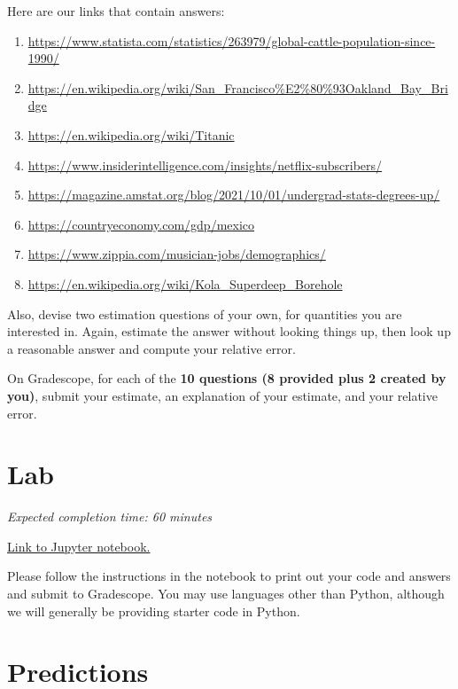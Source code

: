 \documentclass[11pt]{article}
\begin{document}
Here are our links that contain answers:
\begin{enumerate}
\item \url{https://www.statista.com/statistics/263979/global-cattle-population-since-1990/}
\item \url{https://en.wikipedia.org/wiki/San_Francisco%E2%80%93Oakland_Bay_Bridge}
\item \url{https://en.wikipedia.org/wiki/Titanic}
\item \url{https://www.insiderintelligence.com/insights/netflix-subscribers/}
\item \url{https://magazine.amstat.org/blog/2021/10/01/undergrad-stats-degrees-up/}
\item \url{https://countryeconomy.com/gdp/mexico}
\item \url{https://www.zippia.com/musician-jobs/demographics/}
\item \url{https://en.wikipedia.org/wiki/Kola_Superdeep_Borehole}
\end{enumerate}

Also, devise two estimation questions of your own, for quantities you are interested in. Again, estimate the answer without looking things up, then look up a reasonable answer and compute your relative error.

On Gradescope, for each of the \textbf{10 questions (8 provided plus 2 created by you)}, submit your estimate, an explanation of your estimate, and your relative error.

\section*{Lab}

\emph{Expected completion time: 60 minutes}

\href{https://datahub.berkeley.edu/hub/user-redirect/git-pull?repo=https%3A%2F%2Fgithub.com%2Fjs-d%2Fstat-157-260-website&urlpath=tree%2Fstat-157-260-website%2Fhw%2Fhw2%2Fhw2_lab.ipynb&branch=main}{Link to Jupyter notebook.} 

Please follow the instructions in the notebook to print out your code and answers and submit to Gradescope. You may use languages other than Python, although we will generally be providing starter code in Python.



\section*{Predictions}
\end{document}
